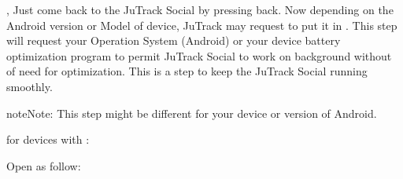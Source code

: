 \documentclass[letterpaper,10pt,english]{sphinxmanual}
\begin{document}
, Just come back to the JuTrack Social by pressing back. Now depending on the Android version or Model of device, JuTrack may request to put it in  .
This step will request your Operation System (Android) or your device battery optimization program to permit JuTrack Social to work on background without of need for optimization.
This is a  step to keep the JuTrack Social running smoothly.

\begin{DUlineblock}{0em}
\item[] 
\end{DUlineblock}


\begin{DUlineblock}{0em}
\item[] 
\end{DUlineblock}

\begin{sphinxadmonition}{note}{Note:}
This step might be different for your device or version of Android.
\end{sphinxadmonition}

for  devices with :

\begin{DUlineblock}{0em}
\item[] 
\end{DUlineblock}


\begin{DUlineblock}{0em}
\item[] 
\end{DUlineblock}

Open  as follow:

\begin{DUlineblock}{0em}
\item[] 
\end{DUlineblock}

\end{document}
